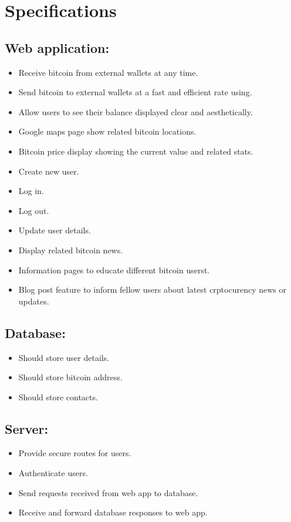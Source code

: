 \section{Specifications}
\subsection{Web application:}
\begin{itemize}
  \item Receive bitcoin from external wallets at any time.
  \item Send bitcoin to external wallets at a fast and efficient rate using.
  \item Allow users to see their balance displayed clear and aesthetically.
  \item Google maps page show related bitcoin locations.
  \item Bitcoin price display showing the current value and related stats.
  \item Create new user.
  \item Log in.
  \item Log out.
  \item Update user details.
  \item Display related bitcoin news.
  \item Information pages to educate different bitcoin userst.
  \item Blog post feature to inform fellow users about latest crptocurency news or updates.
\end{itemize}

\subsection{Database:}
\begin{itemize}
  \item Should store user details.
  \item Should store bitcoin address.
  \item Should store contacts.
\end{itemize}

\subsection{Server:}
\begin{itemize}
  \item Provide secure routes for users.
  \item Authenticate users.
  \item Send requests received from web app to database.
  \item Receive and forward database responses to web app.
\end{itemize}


